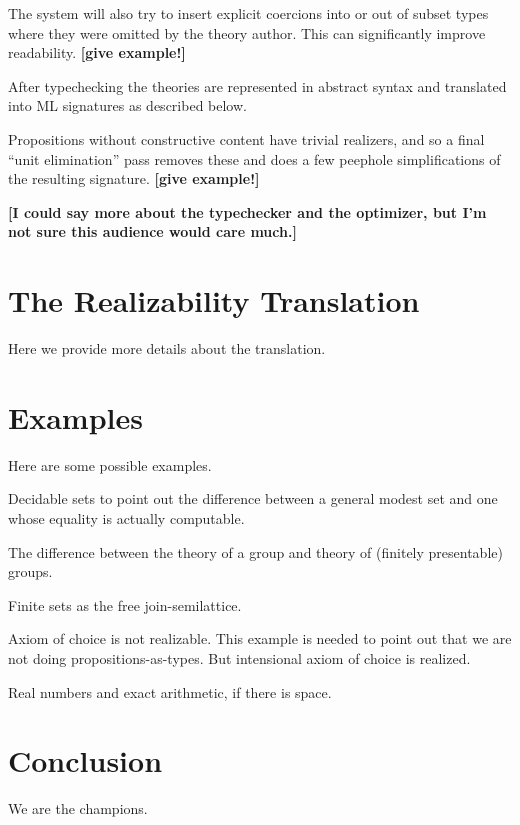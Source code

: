\documentclass{article}
\newcommand{\comment}[1]{\textbf{[#1]}}
\begin{document}
The system will also try to insert explicit coercions into or out of
subset types where they were omitted by the theory author.  This can
significantly improve readability.  \comment{give example!}

After typechecking the theories are represented in abstract syntax and
translated into ML signatures as described below.  

Propositions without constructive content have trivial realizers, and
so a final ``unit elimination'' pass removes these and does a few
peephole simplifications of the resulting signature. \comment{give example!}

\comment{I could say more about the typechecker and the optimizer, but
  I'm not sure this audience would care much.}

\section{The Realizability Translation}
\label{sec:real-transl}

Here we provide more details about the translation.

\section{Examples}
\label{sec:examples}

Here are some possible examples.

Decidable sets to point out the difference between a general modest
set and one whose equality is actually computable.

The difference between the theory of a group and theory of (finitely
presentable) groups.

Finite sets as the free join-semilattice.

Axiom of choice is not realizable. This example is needed to point out
that we are not doing propositions-as-types. But intensional axiom of
choice is realized.

Real numbers and exact arithmetic, if there is space.

\section{Conclusion}
\label{sec:conclusion}

We are the champions.





\end{document}
